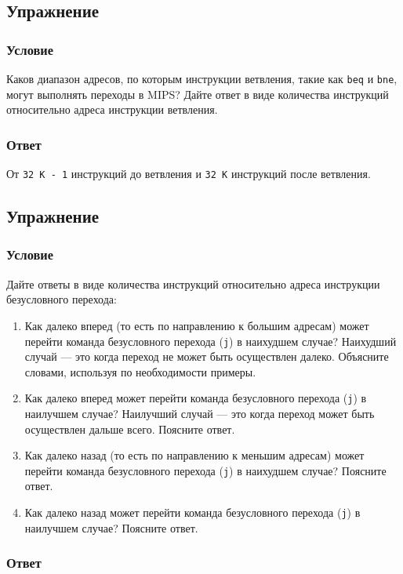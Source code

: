 \documentclass[12pt]{article}
\newenvironment{e}[1][dummy label]{
    \subsection{Упражнение}\label{#1}
    \subsubsection*{Условие}
    }{
    \subsubsection*{Ответ}
}
\begin{document}
    \begin{e}
        Каков диапазон адресов, по которым инструкции ветвления, такие как \texttt{beq} и \texttt{bne}, могут выполнять переходы в MIPS? Дайте ответ в виде количества инструкций относительно адреса инструкции ветвления.
    \end{e}

    От \texttt{32 K - 1} инструкций до ветвления и \texttt{32 K} инструкций после ветвления.

    \newpage

    \begin{e}
        Дайте ответы в виде количества инструкций относительно адреса инструкции безусловного перехода:
        \begin{enumerate}
            \item Как далеко вперед (то есть по направлению к большим адресам) может перейти команда безусловного перехода (\texttt{j}) в наихудшем случае? Наихудший случай --- это когда переход не может быть осуществлен далеко. Объясните словами, используя по необходимости примеры.
            \item Как далеко вперед может перейти команда безусловного перехода (\texttt{j}) в наилучшем случае? Наилучший случай --- это когда переход может быть осуществлен дальше всего. Поясните ответ.
            \item Как далеко назад (то есть по направлению к меньшим адресам) может перейти команда безусловного перехода (\texttt{j}) в наихудшем случае? Поясните ответ.
            \item Как далеко назад может перейти команда безусловного перехода (\texttt{j}) в наилучшем случае? Поясните ответ.
        \end{enumerate}
    \end{e}
\end{document}

